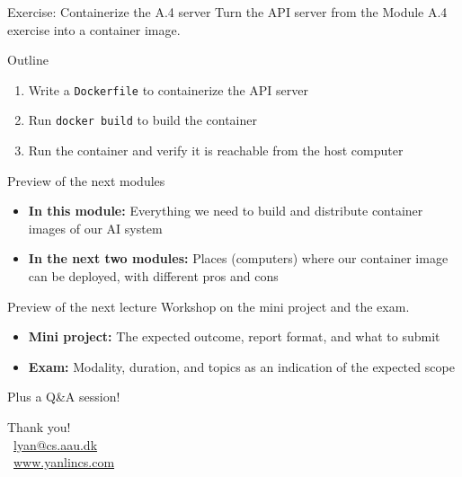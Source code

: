 \documentclass[aspectratio=169]{beamer}
\begin{document}
\begin{frame}{Exercise: Containerize the A.4 server}
    Turn the API server from the Module A.4 exercise into a container image.

    \begin{block}{Outline}
        \begin{enumerate}
            \item Write a \texttt{Dockerfile} to containerize the API server
            \item Run \texttt{docker build} to build the container
            \item Run the container and verify it is reachable from the host computer
        \end{enumerate}
    \end{block}
\note{
}
\end{frame}


\begin{frame}{Preview of the next modules}
\begin{itemize}
  \item \textbf{In this module:} Everything we need to build and distribute container images of our AI system
  \item \textbf{In the next two modules:} Places (computers) where our container image can be deployed, with different pros and cons
\end{itemize}

\note{
}
\end{frame}


\begin{frame}{Preview of the next lecture}
  Workshop on the mini project and the exam.
\begin{itemize}
  \item \textbf{Mini project:} The expected outcome, report format, and what to submit
  \item \textbf{Exam:} Modality, duration, and topics as an indication of the expected scope
\end{itemize}
  Plus a Q\&A session!

\note{
}
\end{frame}



\appendix

\begin{frame}
\begin{center}
{\large Thank you!}
\vspace{1cm}
\\[0.5em]
{\small \faEnvelope\ \href{mailto:lyan@cs.aau.dk}{lyan@cs.aau.dk} \\
\faGlobe\ \href{https://www.yanlincs.com}{www.yanlincs.com}}
\end{center}
\note{
}
\end{frame}
\end{document}
